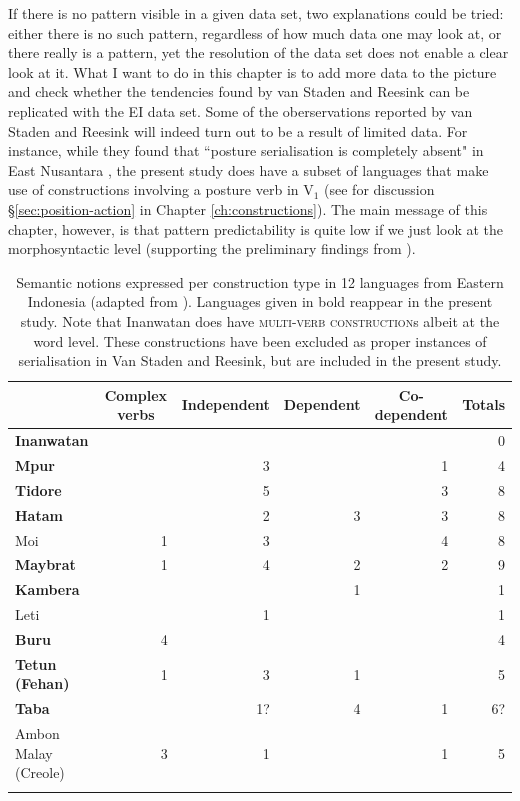 If there is no pattern visible in a given data set, two explanations could be tried: either there is no such pattern, regardless of how much data one may look at, or there really is a pattern, yet the resolution of the data set does not enable a clear look at it. What I want to do in this chapter is to add more data to the picture and check whether the tendencies found by van Staden and Reesink can be replicated with the EI data set. Some of the oberservations reported by van Staden and Reesink will indeed turn out to be a result of limited data. For instance, while they found that ``posture serialisation is completely absent" in East Nusantara \citep[48]{vanstaden2008serial}, the present study does have a subset of languages that make use of constructions involving a posture verb in V$_1$ (see for discussion §\ref{sec:position-action} in Chapter \ref{ch:constructions}). The main message of this chapter, however, is that pattern predictability is quite low if we just look at the morphosyntactic level (supporting the preliminary findings from \citealt{vanstaden2008serial}).

\begin{table}
\begin{tabular}{lrrrrr}
\lsptoprule
\multicolumn{1}{l}{language}&\multicolumn{1}{c}{Complex verbs}&\multicolumn{1}{c}{Independent}&\multicolumn{1}{c}{Dependent}&\multicolumn{1}{c}{Co-dependent}&\multicolumn{1}{c}{Totals}\tabularnewline
\hline
\textbf{Inanwatan}& & & & &0\tabularnewline
\textbf{Mpur}& &3& &1&4\tabularnewline
\textbf{Tidore}& &5& &3&8\tabularnewline
\textbf{Hatam}& &2&3&3&8\tabularnewline
Moi&1&3& &4&8\tabularnewline
\textbf{Maybrat}&1&4&2&2&9\tabularnewline
\hline
\textbf{Kambera}& & &1& &1\tabularnewline
Leti& &1& & &1\tabularnewline
\textbf{Buru}&4& & & &4\tabularnewline
\textbf{Tetun (Fehan)}&1&3&1& &5\tabularnewline
\textbf{Taba}& &1?&4&1&6?\tabularnewline
\hline
Ambon Malay (Creole)&3&1& &1&5\tabularnewline
\lspbottomrule
\end{tabular}
\caption[Semantic notions expressed per construction type in each language (from van Staden & Reesink 2008: 47]{Semantic notions expressed per construction type in 12 languages from Eastern Indonesia (adapted from \citealt[47]{vanstaden2008serial}). Languages given in bold reappear in the present study. Note that Inanwatan does have \textsc{multi-verb construction}s albeit at the word level. These constructions have been excluded as proper instances of serialisation in Van Staden and Reesink, but are included in the present study.}
\label{table:VanStadenReesink2008}
\end{table}

